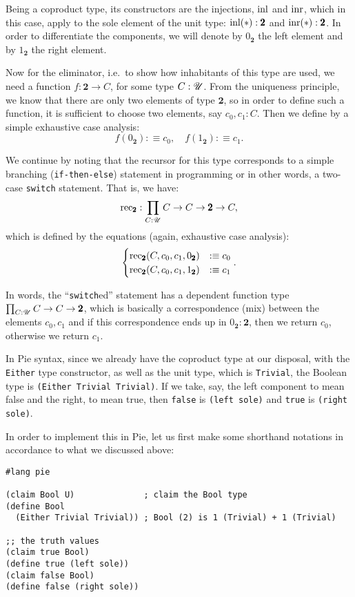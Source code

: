 Being a coproduct type, its constructors are the injections, $ \mathrm{inl} $
and $ \mathrm{inr} $, which in this case, apply to the sole element of the
unit type: $ \mathrm{inl}(\ast) : \pmb{2} $ and $ \mathrm{inr}(\ast) : \pmb{2} $.
In order to differentiate the components, we will denote by $ 0_{\pmb{2}} $
the left element and by $ 1_{\pmb{2}} $ the right element.

Now for the eliminator, i.e.\ to show how inhabitants of this type are
used, we need a function $ f : \pmb{2} \to C $, for some type $ C : \mathscr{U} $.
From the uniqueness principle, we know that there are only two elements of
type $ \pmb{2} $, so in order to define such a function, it is sufficient to
choose two elements, say $ c_0, c_1 : C $. Then we define by a simple exhaustive
case analysis:
\[
  f(0_{\pmb{2}}) :\equiv c_0, \quad f(1_{\pmb{2}}) :\equiv c_1.
\]

We continue by noting that the recursor for this type corresponds to a
simple branching (\texttt{if-then-else}) statement in programming or in
other words, a two-case \texttt{switch} statement. That is, we have:
\[
  \mathrm{rec}_{\pmb{2}} : \prod_{C : \mathscr{U}} C \to C \to \pmb{2} \to C,
\]
which is defined by the equations (again, exhaustive case analysis):
\[
  \begin{cases}
    \mathrm{rec}_{\pmb{2}}(C, c_0, c_1, 0_{\pmb{2}}) &:\equiv c_0 \\
    \mathrm{rec}_{\pmb{2}}(C, c_0, c_1, 1_{\pmb{2}}) &:\equiv c_1
  \end{cases}.
\]

In words, the ``\texttt{switch}ed'' statement has a dependent function
type $ \prod_{C : \mathscr{U}} C \to C \to \pmb{2} $, which is basically
a correspondence (mix) between the elements $ c_0, c_1 $ and if this
correspondence ends up in $ 0_{\pmb{2}} : \pmb{2} $, then we return $ c_0 $,
otherwise we return $ c_1 $.

\vspace{0.3cm}

In Pie syntax, since we already have the coproduct type at our disposal,
with the \texttt{Either} type constructor, as well as the unit type,
which is \texttt{Trivial}, the Boolean type is \texttt{(Either Trivial Trivial)}.
If we take, say, the left component to mean false and the right, to mean true, then
\texttt{false} is \texttt{(left sole)} and \texttt{true} is \texttt{(right sole)}.

In order to implement this in Pie, let us first make some shorthand
notations in accordance to what we discussed above:
{
  \small
\begin{verbatim}
#lang pie

(claim Bool U)              ; claim the Bool type
(define Bool 
  (Either Trivial Trivial)) ; Bool (2) is 1 (Trivial) + 1 (Trivial)

;; the truth values
(claim true Bool)
(define true (left sole))
(claim false Bool)
(define false (right sole))
\end{verbatim}
}

